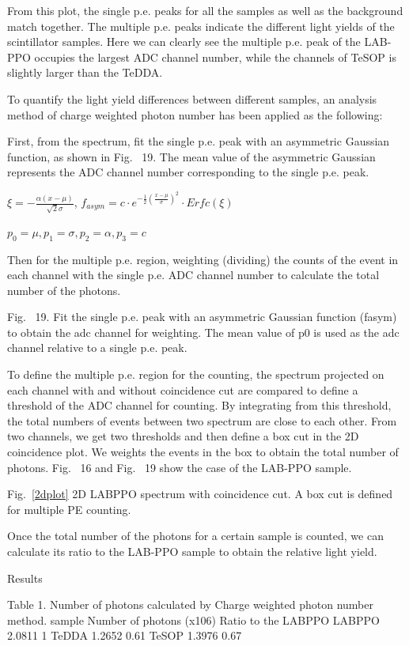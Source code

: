From this plot, the single p.e. peaks for all the samples as well as the background match together. The multiple p.e. peaks indicate the different light yields of the scintillator samples. Here we can clearly see the multiple p.e. peak of the LAB-PPO occupies the largest ADC channel number, while the channels of TeSOP is slightly larger than the TeDDA. 

To quantify the light yield differences between different samples, an analysis method of charge weighted photon number has been applied as the following:

First, from the spectrum, fit the single p.e. peak with an asymmetric Gaussian function, as shown in Fig.~ 19. The mean value of the asymmetric Gaussian represents the ADC channel number corresponding to the single p.e. peak.

$\xi=-\frac{\alpha(x-\mu)}{\sqrt 2\sigma}$,
$f_{asym}=c\cdot e^{-\frac{1}{2}(\frac{x-\mu}{\sigma})^2}\cdot Erfc(\xi)$

$p_0=\mu,p_1=\sigma,p_2=\alpha, p_3=c$ 


Then for the multiple p.e. region, weighting (dividing) the counts of the event in each channel with the single p.e. ADC channel number to calculate the total number of the photons.


Fig.~ 19. Fit the single p.e. peak with an asymmetric Gaussian function (fasym) to obtain the adc channel for weighting. The mean value of p0 is used as the adc channel relative to a single p.e. peak.

To define the multiple p.e. region for the counting, the spectrum projected on each channel with and without coincidence cut are compared to define a threshold of the ADC channel for counting. By integrating from this threshold, the total numbers of events between two spectrum are close to each other. From two channels, we get two thresholds and then define a box cut in the 2D coincidence plot. We weights the events in the box to obtain the total number of photons. Fig.~ 16 and Fig.~ 19 show the case of the LAB-PPO sample.


Fig.~\ref{2dplot} 2D LABPPO spectrum with coincidence cut. A box cut is defined for multiple PE counting. 

Once the total number of the photons for a certain sample is counted, we can calculate its ratio to the LAB-PPO sample to obtain the relative light yield.

Results

Table 1. Number of photons calculated by Charge weighted photon number method.
sample	Number of photons (x106)	Ratio to the LABPPO
LABPPO	2.0811	1 
TeDDA	1.2652	0.61
TeSOP	1.3976	0.67

